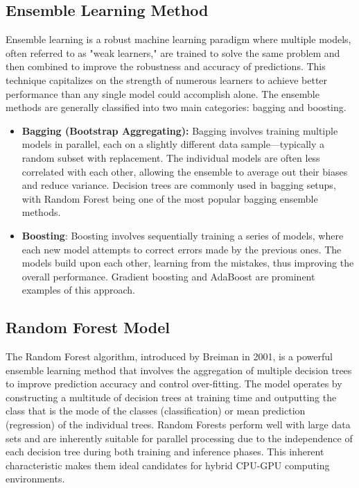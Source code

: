 \documentclass[11.5pt]{article}
\begin{document}
\subsection{Ensemble Learning Method}
Ensemble learning is a robust machine learning paradigm where multiple models, often referred to as "weak learners," are trained to solve the same problem and then combined to improve the robustness and accuracy of predictions. 
This technique capitalizes on the strength of numerous learners to achieve better performance than any single model could accomplish alone.
The ensemble methods are generally classified into two main categories: bagging and boosting.
\begin{itemize}
    \item \textbf{Bagging (Bootstrap Aggregating):} 
    Bagging involves training multiple models in parallel, each on a slightly different data sample—typically a random subset with replacement. The individual models are often less correlated with each other, allowing the ensemble to average out their biases and reduce variance. Decision trees are commonly used in bagging setups, with Random Forest being one of the most popular bagging ensemble methods.
    \item \textbf{Boosting}:
    Boosting involves sequentially training a series of models, where each new model attempts to correct errors made by the previous ones. The models build upon each other, learning from the mistakes, thus improving the overall performance. Gradient boosting and AdaBoost are prominent examples of this approach.
\end{itemize}


\subsection{Random Forest Model}
The Random Forest algorithm, introduced by Breiman in 2001, is a powerful ensemble learning method that involves the aggregation of multiple decision trees to improve prediction accuracy and control over-fitting. 
The model operates by constructing a multitude of decision trees at training time and outputting the class that is the mode of the classes (classification) or mean prediction (regression) of the individual trees. 
Random Forests perform well with large data sets and are inherently suitable for parallel processing due to the independence of each decision tree during both training and inference phases. 
This inherent characteristic makes them ideal candidates for hybrid CPU-GPU computing environments.
\end{document}
